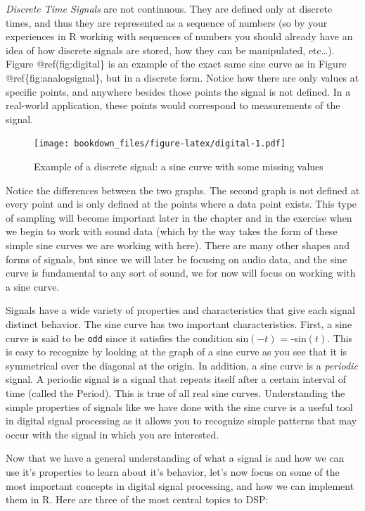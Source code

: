 \documentclass[
]{krantz}
\begin{document}
\emph{Discrete Time Signals} are not continuous. They are defined only at discrete times, and thus they are represented as a sequence of numbers (so by your experiences in R working with sequences of numbers you should already have an idea of how discrete signals are stored, how they can be manipulated, etc\ldots). Figure @ref(fig:digital\} is an example of the exact same sine curve as in Figure @ref\{fig:analogsignal\}, but in a discrete form. Notice how there are only values at specific points, and anywhere besides those points the signal is not defined. In a real-world application, these points would correspond to measurements of the signal.

\begin{figure}
\centering
\texttt{[image: bookdown\_files/figure-latex/digital-1.pdf]}
\caption{\label{fig:digital}Example of a discrete signal: a sine curve with some missing values}
\end{figure}

Notice the differences between the two graphs. The second graph is not defined at every point and is only defined at the points where a data point exists. This type of sampling will become important later in the chapter and in the exercise when we begin to work with sound data (which by the way takes the form of these simple sine curves we are working with here). There are many other shapes and forms of signals, but since we will later be focusing on audio data, and the sine curve is fundamental to any sort of sound, we for now will focus on working with a sine curve.

Signals have a wide variety of properties and characteristics that give each signal distinct behavior. The sine curve has two important characteristics. First, a sine curve is said to be \texttt{odd} since it satisfies the condition sin\((-t)\) = -sin\((t)\). This is easy to recognize by looking at the graph of a sine curve as you see that it is symmetrical over the diagonal at the origin. In addition, a sine curve is a \emph{periodic} signal. A periodic signal is a signal that repeats itself after a certain interval of time (called the Period). This is true of all real sine curves. Understanding the simple properties of signals like we have done with the sine curve is a useful tool in digital signal processing as it allows you to recognize simple patterns that may occur with the signal in which you are interested.

Now that we have a general understanding of what a signal is and how we can use it's properties to learn about it's behavior, let's now focus on some of the most important concepts in digital signal processing, and how we can implement them in R. Here are three of the most central topics to DSP:
\end{document}
